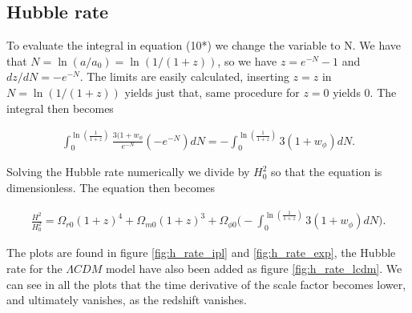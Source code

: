 \documentclass[a4paper,10pt]{article}
\begin{document}
\subsection{Hubble rate}
To evaluate the integral in equation (10*) we change the variable to N. We have that $N = \ln(a/a_0) = \ln(1/(1+z))$, so we have $z = e^{-N} - 1$ and $dz/dN = -e^{-N}$. The limits are easily calculated, inserting $z = z$ in $N = \ln(1/(1+z))$ yields just that, same procedure for $z=0$ yields 0. The integral then becomes

\begin{align}
\int_0^{\ln(\frac{1}{1+z})}\frac{3(1+w_{\phi}}{e^{-N}}(-e^{-N})dN = -\int_0^{\ln(\frac{1}{1+z})}3(1+w_{\phi}) dN.
\end{align}

Solving the Hubble rate numerically we divide by $H_0^2$ so that the equation is dimensionless. The equation then becomes

\begin{align}
\frac{H^2}{H_0^2} = \Omega_{r0}(1+z)^4 + \Omega_{m0}(1+z)^3 + \Omega_{\phi 0}\bigg(-\int_0^{\ln(\frac{1}{1+z})}3(1+w_{\phi})dN\bigg).
\end{align}

The plots are found in figure \ref{fig:h_rate_ipl} and \ref{fig:h_rate_exp}, the Hubble rate for the $\Lambda CDM$ model have also been added as figure \ref{fig:h_rate_lcdm}. We can see in all the plots that the time derivative of the scale factor becomes lower, and ultimately vanishes, as the redshift vanishes.
\end{document}

